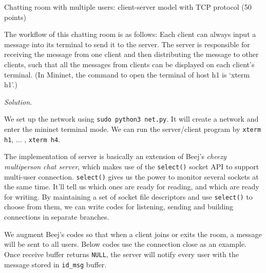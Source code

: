 \begin{exercise}[]{Chatting room with multiple users: client-server model with TCP protocol (50 points)

  The workflow of this chatting room is as follows: Each client can always input a message into its terminal to send it to the server. The server is responsible for receiving the message from one client and then distributing the message to other clients, such that all the messages from clients can be displayed on each client’s terminal. (In Mininet, the command to open the terminal of host h1 is ‘xterm h1’.)
    }

\noindent\emph{Solution.}

  We set up the network using \texttt{sudo python3 net.py}. It will create a network and enter the mininet terminal mode. We can run the server/client program by \texttt{xterm h1}, ... , \texttt{xterm h4}.
  
  The implementation of server is basically an extension of Beej's \emph{cheezy multiperson chat server}, which makes use of the \texttt{select()} socket API to support multi-user connection. \texttt{select()} gives us the power to monitor several sockets at the same time. It’ll tell us which ones are ready for reading, and which are ready for writing. By maintaining a set of socket file descriptors and use \texttt{select()} to choose from them, we can write codes for listening, sending and building connections in separate branches.

  We augment Beej's codes so that when a client joins or exits the room, a message will be sent to all users. Below codes use the connection close as an example. Once receive buffer returns \texttt{NULL}, the server will notify every user with the message stored in \texttt{id\_msg} buffer.


\end{exercise}
